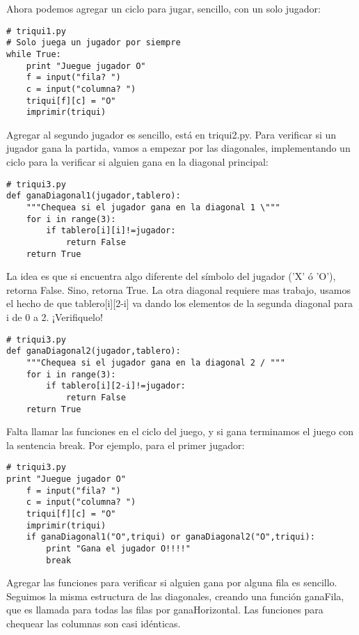 Ahora podemos agregar un ciclo para jugar, sencillo, con un solo jugador:

\beforeverb
\begin{verbatim}
# triqui1.py
# Solo juega un jugador por siempre 
while True:
    print "Juegue jugador O"
    f = input("fila? ")
    c = input("columna? ")
    triqui[f][c] = "O"
    imprimir(triqui)
\end{verbatim}
\afterverb

Agregar al segundo jugador es sencillo, está en triqui2.py. Para verificar si 
un jugador gana la partida, vamos a empezar por las diagonales, implementando
un ciclo para la verificar si alguien gana en la diagonal principal:

\beforeverb
\begin{verbatim}
# triqui3.py
def ganaDiagonal1(jugador,tablero):
    """Chequea si el jugador gana en la diagonal 1 \"""
    for i in range(3):
        if tablero[i][i]!=jugador:
            return False
    return True
\end{verbatim}
\afterverb

La idea es que si encuentra algo diferente del símbolo del jugador ('X' ó 'O'),
retorna False. Sino, retorna True. La otra diagonal requiere mas trabajo, usamos 
el hecho de que tablero[i][2-i] va dando los elementos de la segunda
diagonal para i de 0 a 2. ¡Verifiquelo!

\beforeverb
\begin{verbatim}
# triqui3.py
def ganaDiagonal2(jugador,tablero):
    """Chequea si el jugador gana en la diagonal 2 / """
    for i in range(3):
        if tablero[i][2-i]!=jugador:
            return False
    return True
\end{verbatim}
\afterverb

Falta llamar las funciones en el ciclo del juego, y si gana terminamos el juego 
con la sentencia break. Por ejemplo, para el primer jugador:

\beforeverb
\begin{verbatim}
# triqui3.py
print "Juegue jugador O"
    f = input("fila? ")
    c = input("columna? ")
    triqui[f][c] = "O"
    imprimir(triqui)
    if ganaDiagonal1("O",triqui) or ganaDiagonal2("O",triqui):
        print "Gana el jugador O!!!!"
        break
\end{verbatim}
\afterverb

Agregar las funciones para verificar si alguien gana por alguna fila es sencillo.
Seguimos la misma estructura de las diagonales, creando una función ganaFila, que
es llamada para todas las filas por ganaHorizontal. Las funciones para chequear
las columnas son casi idénticas.

